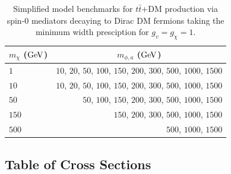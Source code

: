 \begin{table}[!ht]
\centering
\begin{tabular}{| l | r |}
\hline
\multicolumn{1}{|c|}{$m_{\chi}$ (${\rm GeV}$)} & \multicolumn{1}{c|}{$m_{\phi,a}$ (${\rm GeV}$)} \\
\hline
 $1$    & $10$, $20$, $50$, $100$, $150$, $200$, $300$, $500$, $1000$, $1500$  \\
 $10$   & $10$, $20$, $50$, $100$, $150$, $200$, $300$, $500$, $1000$, $1500$  \\
 $50$   &             $50$, $100$, $150$, $200$, $300$, $500$, $1000$, $1500$  \\
 $150$  &                          $150$, $200$, $300$, $500$, $1000$, $1500$  \\
 $500$  &                                               $500$, $1000$, $1500$  \\
\hline
\end{tabular}
\caption{Simplified model benchmarks for $t\bar{t}$+DM production via spin-0 mediators decaying to Dirac DM fermions taking the minimum width presciption for $g_v = g_{\chi} = 1$.}
\label{tab:ttdm_benchmarks}
\end{table}

\newpage
\subsection{Table of Cross Sections}
\label{subsec:xsectable}


